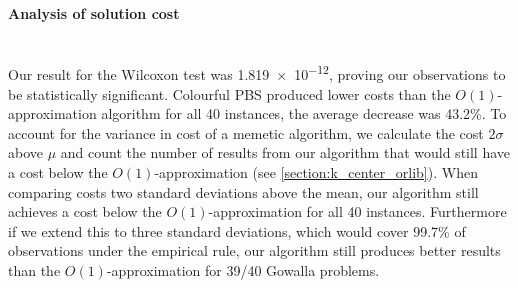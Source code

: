 

\paragraph{Analysis of solution cost}~\\
Our result for the Wilcoxon test was \num{1.819e-12}, proving our observations to be statistically significant. Colourful PBS produced lower costs than the $O(1)$-approximation algorithm for all 40 instances, the average decrease was 43.2\%. To account for the variance in cost of a memetic algorithm, we calculate the cost $2\sigma$ above $\mu$ and count the number of results from our algorithm that would still have a cost below the $O(1)$-approximation (see \cref{section:k_center_orlib}). When comparing costs two standard deviations above the mean, our algorithm still achieves a cost below the $O(1)$-approximation for all 40 instances. Furthermore if we extend this to three standard deviations, which would cover 99.7\% of observations under the empirical rule, our algorithm still produces better results than the $O(1)$-approximation for 39/40 Gowalla problems.